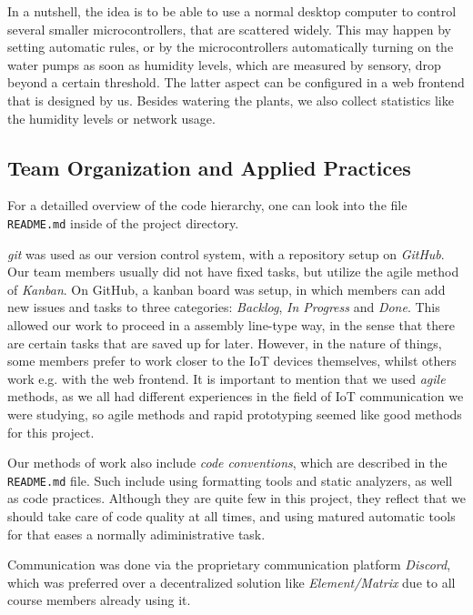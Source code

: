 \documentclass[10pt, a4paper]{article}
\begin{document}
    In a nutshell, the idea is to be able to use a normal desktop computer to control several smaller microcontrollers, that are scattered widely. This may happen by setting automatic rules, or by the microcontrollers automatically turning on the water pumps as soon as humidity levels, which are measured by sensory, drop beyond a certain threshold. The latter aspect can be configured in a web frontend that is designed by us. Besides watering the plants, we also collect statistics like the humidity levels or network usage.

    \subsection{Team Organization and Applied Practices}

    For a detailled overview of the code hierarchy, one can look into the file \texttt{README.md} inside of the project directory.
    
    \emph{git} was used as our version control system, with a repository setup on \emph{GitHub}. Our team members usually did not have fixed tasks, but utilize the agile method of \emph{Kanban}. On GitHub, a kanban board was setup, in which members can add new issues and tasks to three categories: \emph{Backlog}, \emph{In Progress} and \emph{Done}. This allowed our work to proceed in a assembly line-type way, in the sense that there are certain tasks that are saved up for later. However, in the nature of things, some members prefer to work closer to the IoT devices themselves, whilst others work e.g. with the web frontend. It is important to mention that we used \emph{agile} methods, as we all had different experiences in the field of IoT communication we were studying, so agile methods and rapid prototyping seemed like good methods for this project.

    Our methods of work also include \emph{code conventions}, which are described in the \texttt{README.md} file. Such include using formatting tools and static analyzers, as well as code practices. Although they are quite few in this project, they reflect that we should take care of code quality at all times, and using matured automatic tools for that eases a normally adiministrative task.

    Communication was done via the proprietary communication platform \emph{Discord}, which was preferred over a decentralized solution like \emph{Element/Matrix} due to all course members already using it.
\end{document}
